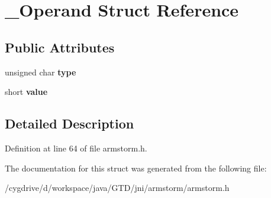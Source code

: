 \hypertarget{struct__Operand}{\section{\-\_\-\-Operand Struct Reference}
\label{struct__Operand}
}
\subsection*{Public Attributes}
\begin{DoxyCompactItemize}
\item 
\hypertarget{struct__Operand_a7688d2d73dd1688d6bab0346687c83f2}{unsigned char {\bfseries type}}\label{struct__Operand_a7688d2d73dd1688d6bab0346687c83f2}

\item 
\hypertarget{struct__Operand_aeb1a79f0a6be79b0c78b870bbb9f180a}{short {\bfseries value}}\label{struct__Operand_aeb1a79f0a6be79b0c78b870bbb9f180a}

\end{DoxyCompactItemize}


\subsection{Detailed Description}


Definition at line 64 of file armstorm.\-h.



The documentation for this struct was generated from the following file\-:\begin{DoxyCompactItemize}
\item 
/cygdrive/d/workspace/java/\-G\-T\-D/jni/armstorm/armstorm.\-h\end{DoxyCompactItemize}
